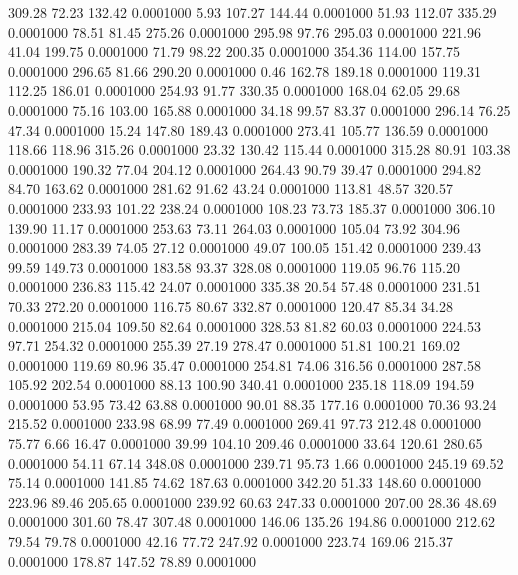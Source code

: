  309.28   72.23  132.42   0.0001000
   5.93  107.27  144.44   0.0001000
  51.93  112.07  335.29   0.0001000
  78.51   81.45  275.26   0.0001000
 295.98   97.76  295.03   0.0001000
 221.96   41.04  199.75   0.0001000
  71.79   98.22  200.35   0.0001000
 354.36  114.00  157.75   0.0001000
 296.65   81.66  290.20   0.0001000
   0.46  162.78  189.18   0.0001000
 119.31  112.25  186.01   0.0001000
 254.93   91.77  330.35   0.0001000
 168.04   62.05   29.68   0.0001000
  75.16  103.00  165.88   0.0001000
  34.18   99.57   83.37   0.0001000
 296.14   76.25   47.34   0.0001000
  15.24  147.80  189.43   0.0001000
 273.41  105.77  136.59   0.0001000
 118.66  118.96  315.26   0.0001000
  23.32  130.42  115.44   0.0001000
 315.28   80.91  103.38   0.0001000
 190.32   77.04  204.12   0.0001000
 264.43   90.79   39.47   0.0001000
 294.82   84.70  163.62   0.0001000
 281.62   91.62   43.24   0.0001000
 113.81   48.57  320.57   0.0001000
 233.93  101.22  238.24   0.0001000
 108.23   73.73  185.37   0.0001000
 306.10  139.90   11.17   0.0001000
 253.63   73.11  264.03   0.0001000
 105.04   73.92  304.96   0.0001000
 283.39   74.05   27.12   0.0001000
  49.07  100.05  151.42   0.0001000
 239.43   99.59  149.73   0.0001000
 183.58   93.37  328.08   0.0001000
 119.05   96.76  115.20   0.0001000
 236.83  115.42   24.07   0.0001000
 335.38   20.54   57.48   0.0001000
 231.51   70.33  272.20   0.0001000
 116.75   80.67  332.87   0.0001000
 120.47   85.34   34.28   0.0001000
 215.04  109.50   82.64   0.0001000
 328.53   81.82   60.03   0.0001000
 224.53   97.71  254.32   0.0001000
 255.39   27.19  278.47   0.0001000
  51.81  100.21  169.02   0.0001000
 119.69   80.96   35.47   0.0001000
 254.81   74.06  316.56   0.0001000
 287.58  105.92  202.54   0.0001000
  88.13  100.90  340.41   0.0001000
 235.18  118.09  194.59   0.0001000
  53.95   73.42   63.88   0.0001000
  90.01   88.35  177.16   0.0001000
  70.36   93.24  215.52   0.0001000
 233.98   68.99   77.49   0.0001000
 269.41   97.73  212.48   0.0001000
  75.77    6.66   16.47   0.0001000
  39.99  104.10  209.46   0.0001000
  33.64  120.61  280.65   0.0001000
  54.11   67.14  348.08   0.0001000
 239.71   95.73    1.66   0.0001000
 245.19   69.52   75.14   0.0001000
 141.85   74.62  187.63   0.0001000
 342.20   51.33  148.60   0.0001000
 223.96   89.46  205.65   0.0001000
 239.92   60.63  247.33   0.0001000
 207.00   28.36   48.69   0.0001000
 301.60   78.47  307.48   0.0001000
 146.06  135.26  194.86   0.0001000
 212.62   79.54   79.78   0.0001000
  42.16   77.72  247.92   0.0001000
 223.74  169.06  215.37   0.0001000
 178.87  147.52   78.89   0.0001000
